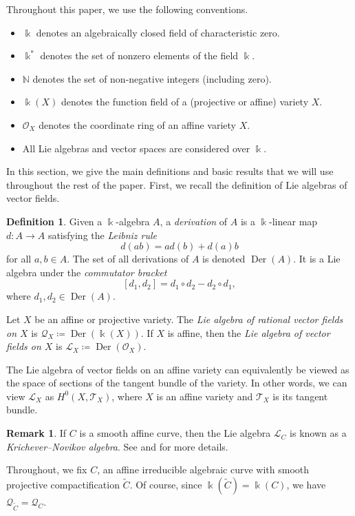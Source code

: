 \documentclass[12pt]{amsart}
\theoremstyle{plain}
\theoremstyle{definition}
\newtheorem{definition}[theorem]{Definition}
\newtheorem{remark}[theorem]{Remark}
\numberwithin{equation}{section}
\def\L{\mathcal{L}}
\def\T{\mathcal{T}}
\def\O{\mathcal{O}}
\def\Q{\mathcal{Q}}
\def\NN{\mathbb{N}}
\def\kk{\Bbbk}
\DeclareMathOperator{\Der}{Der}
\begin{document}
Throughout this paper, we use the following conventions.
\begin{itemize}
    \item $\kk$ denotes an algebraically closed field of characteristic zero.
    \item $\kk^*$ denotes the set of nonzero elements of the field $\kk$.
    \item $\NN$ denotes the set of non-negative integers (including zero).
    \item $\kk(X)$ denotes the function field of a (projective or affine) variety $X$.
    \item $\O_X$ denotes the coordinate ring of an affine variety $X$.
    \item All Lie algebras and vector spaces are considered over $\kk$.
\end{itemize}
In this section, we give the main definitions and basic results that we will use throughout the rest of the paper. First, we recall the definition of Lie algebras of vector fields.

\begin{definition}
    Given a $\kk$-algebra $A$, a \emph{derivation} of $A$ is a $\kk$-linear map $d \colon A \to A$ satisfying the \emph{Leibniz rule}
    $$d(ab) = a d(b) + d(a)b$$
    for all $a,b \in A$. The set of all derivations of $A$ is denoted $\Der(A)$. It is a Lie algebra under the \emph{commutator bracket}
    $$[d_1,d_2] = d_1 \circ d_2 - d_2 \circ d_1,$$
    where $d_1,d_2 \in \Der(A)$.
    
    Let $X$ be an affine or projective variety. The \emph{Lie algebra of rational vector fields on $X$} is $\Q_X \coloneqq \Der(\kk(X))$. If $X$ is affine, then the \emph{Lie algebra of vector fields on $X$} is $\L_X \coloneqq \Der(\O_X)$.
\end{definition}

The Lie algebra of vector fields on an affine variety can equivalently be viewed as the space of sections of the tangent bundle of the variety. In other words, we can view $\L_X$ as $H^0(X,\T_X)$, where $X$ is an affine variety and $\T_X$ is its tangent bundle.

\begin{remark}
    If $C$ is a smooth affine curve, then the Lie algebra $\L_C$ is known as a \emph{Krichever--Novikov algebra}. See \cite{Schlichenmaier} and \cite{Buzaglo} for more details.
\end{remark}

Throughout, we fix $C$, an affine irreducible algebraic curve with smooth projective compactification $\widetilde{C}$. Of course, since $\kk(\widetilde{C}) = \kk(C)$, we have $\Q_{\widetilde{C}} = \Q_C$.
\end{document}
